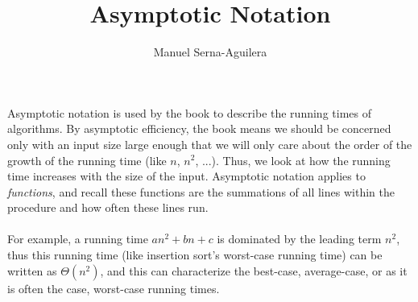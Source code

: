 \documentclass[12pt]{article}
\title{Asymptotic Notation}
\author{Manuel Serna-Aguilera}
\date{}
\begin{document}
\maketitle
Asymptotic notation is used by the book to describe the running times of algorithms. By asymptotic efficiency, the book means we should be concerned only with an input size large enough that we will only care about the order of the growth of the running time (like $n$, $n^2$, ...). Thus, we look at how the running time increases with the size of the input. Asymptotic notation applies to \textit{functions}, and recall these functions are the summations of all lines within the procedure and how often these lines run. 
\\ \\
For example, a running time $an^2 + bn + c$ is dominated by the leading term $n^2$, thus this running time (like insertion sort's worst-case running time) can be written as $\Theta{(n^2)}$, and this can characterize the best-case, average-case, or as it is often the case, worst-case running times.
\end{document}
